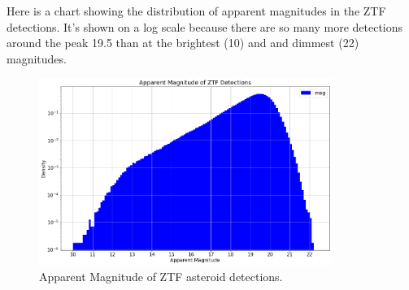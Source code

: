 Here is a chart showing the distribution of apparent magnitudes in the ZTF detections.
It's shown on a log scale because there are so many more detections around the peak 19.5
than at the brightest (10) and and dimmest (22) magnitudes. 
\begin{figure}[hbt!]
\begin{center}
\includegraphics[width=0.85\textwidth]{../figs/ztf/apparent_mag.png}
\caption{Apparent Magnitude of ZTF asteroid detections.}
\end{center}
\end{figure}
\clearpage

